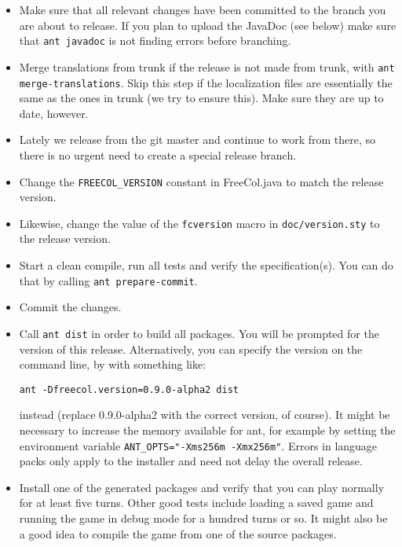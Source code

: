 \documentclass[12pt]{book}
\begin{document}
\begin{itemize}

\item Make sure that all relevant changes have been committed to the
  branch you are about to release.  If you plan to upload the JavaDoc
  (see below) make sure that \verb+ant javadoc+ is not finding errors
  before branching.

\item Merge translations from trunk if the release is not made from
  trunk, with \verb+ant merge-translations+.  Skip this step if the
  localization files are essentially the same as the ones in trunk (we
  try to ensure this).  Make sure they are up to date, however.

\item Lately we release from the git master and continue to work from
  there, so there is no urgent need to create a special release branch.

\item Change the \verb+FREECOL_VERSION+ constant in FreeCol.java to
  match the release version.

\item Likewise, change the value of the \verb+fcversion+ macro in
  \texttt{doc/version.sty} to the release version.

\item Start a clean compile, run all tests and verify the
  specification(s). You can do that by calling \verb+ant prepare-commit+.
 
\item Commit the changes.

\item Call \verb+ant dist+ in order to build all packages. You will be
  prompted for the version of this release. Alternatively, you can
  specify the version on the command line, by with something like:
\begin{verbatim}ant -Dfreecol.version=0.9.0-alpha2 dist
\end{verbatim}
  instead (replace 0.9.0-alpha2 with the correct version, of
  course). It might be necessary to increase the memory available for
  ant, for example by setting the environment variable
  \verb|ANT_OPTS="-Xms256m -Xmx256m"|.  Errors in language packs
  only apply to the installer and need not delay the overall release.

\item Install one of the generated packages and verify that you can play
  normally for at least five turns. Other good tests include loading a
  saved game and running the game in debug mode for a hundred turns or
  so. It might also be a good idea to compile the game from one of the
  source packages.


\end{itemize}
\end{document}
